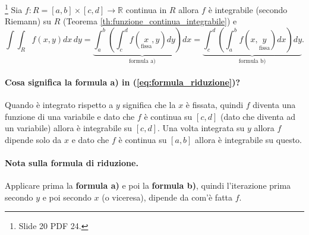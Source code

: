 \begin{theorem}\label{th:riduzione}\footnote{Slide 20 PDF 24.}
	Sia $f:R=[a,b]\times[c,d]\rightarrow\mathbb{R}$ continua in $R$ allora $f$ è integrabile (secondo Riemann) su $R$ (Teorema \ref{th:funzione_continua_integrabile}) e
	\begin{equation}\label{eq:formula_riduzione}
		\int\int_R f(x,y) dx\, dy = \underbrace{\int^b_a\left(\int^d_c f(\underset{\text{fissa}}{x},y) dy\right) dx}_{\text{formula a)}} =\underbrace{\int^d_c\left(\int^b_a f(x, \underset{\text{fissa}}{y})dx\right)dy}_{\text{formula b)}}.
	\end{equation}
\end{theorem}

\paragraph{Cosa significa la formula a) in (\ref{eq:formula_riduzione})?} Quando è integrato rispetto a $y$ significa che la $x$ è fissata, quindi $f$ diventa una funzione di una variabile e dato che $f$ è continua su $[c,d]$ (dato che diventa ad un variabile) allora è integrabile su $[c,d]$. Una volta integrata su $y$ allora $f$ dipende solo da $x$ e dato che $f$ è continua su $[a,b]$ allora è integrabile su questo.

\paragraph{Nota sulla formula di riduzione.} Applicare prima la \textbf{formula a)} e poi la \textbf{formula b)}, quindi l'iterazione prima secondo $y$ e poi secondo $x$ (o viceresa), dipende da com'è fatta $f$.

